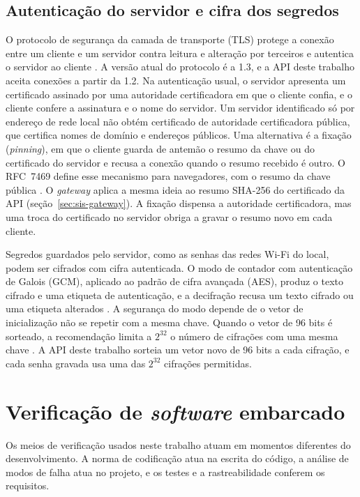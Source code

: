 \subsection{Autenticação do servidor e cifra dos segredos}\label{sec:fund-tls}

O protocolo de segurança da camada de transporte (TLS) protege a conexão entre um cliente e um servidor contra leitura e alteração por terceiros e autentica o servidor ao cliente \cite{rescorla2018}. A versão atual do protocolo é a 1.3, e a API deste trabalho aceita conexões a partir da 1.2. Na autenticação usual, o servidor apresenta um certificado assinado por uma autoridade certificadora em que o cliente confia, e o cliente confere a assinatura e o nome do servidor. Um servidor identificado só por endereço de rede local não obtém certificado de autoridade certificadora pública, que certifica nomes de domínio e endereços públicos. Uma alternativa é a fixação (\textit{pinning}), em que o cliente guarda de antemão o resumo da chave ou do certificado do servidor e recusa a conexão quando o resumo recebido é outro. O RFC~7469 define esse mecanismo para navegadores, com o resumo da chave pública \cite{evans2015}. O \textit{gateway} aplica a mesma ideia ao resumo SHA-256 do certificado da API (seção~\ref{sec:sis-gateway}). A fixação dispensa a autoridade certificadora, mas uma troca do certificado no servidor obriga a gravar o resumo novo em cada cliente.

Segredos guardados pelo servidor, como as senhas das redes Wi-Fi do local, podem ser cifrados com cifra autenticada. O modo de contador com autenticação de Galois (GCM), aplicado ao padrão de cifra avançada (AES), produz o texto cifrado e uma etiqueta de autenticação, e a decifração recusa um texto cifrado ou uma etiqueta alterados \cite{dworkin2007}. A segurança do modo depende de o vetor de inicialização não se repetir com a mesma chave. Quando o vetor de \num{96} bits é sorteado, a recomendação limita a $2^{32}$ o número de cifrações com uma mesma chave \cite{dworkin2007}. A API deste trabalho sorteia um vetor novo de \num{96} bits a cada cifração, e cada senha gravada usa uma das $2^{32}$ cifrações permitidas.

\section{Verificação de \textit{software} embarcado}\label{sec:fund-verificacao}

Os meios de verificação usados neste trabalho atuam em momentos diferentes do desenvolvimento. A norma de codificação atua na escrita do código, a análise de modos de falha atua no projeto, e os testes e a rastreabilidade conferem os requisitos.

